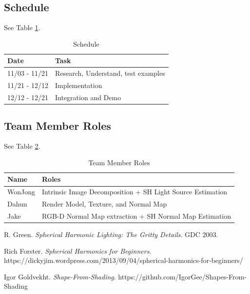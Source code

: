 \documentclass[10pt,twocolumn,letterpaper]{article}
\begin{document}
\subsection{Schedule}
See Table \ref{tab:sched}.
\begin{table}[h]
	\begin{tabular}{l|l}
		\textbf{Date} & Task \\
		\hline
		11/03 - 11/21 & Research, Understand, test examples \\
		11/21 - 12/12 & Implementation \\
		12/12 - 12/21 & Integration and Demo \\
		\hline
	\end{tabular}
	\caption{Schedule}
	\label{tab:sched}
\end{table}

\subsection{Team Member Roles}
See Table \ref{tab:roles}.
\begin{table}[h]
	\begin{tabular}{l|l}
		\textbf{Name} & Roles \\
		\hline
		WonJong & Intrinsic Image Decomposition + SH Light Source Estimation \\
		Dahun & Render Model, Texture, and Normal Map \\
		Jake & RGB-D Normal Map extraction + SH Normal Map Estimation \\
		\hline
	\end{tabular}
	\caption{Team Member Roles}
	\label{tab:roles}
\end{table}

\begin{thebibliography}{1}
	R. Green.
	\textit{Spherical Harmonic Lighting: The Gritty Details}. 
	GDC 2003.
	
	Rich Forster.
	\textit{Spherical Harmonics for Beginners}. 
	https://dickyjim.wordpress.com/2013/09/04/spherical-harmonics-for-beginners/
	
	
	Igor Goldvekht. 
	\textit{Shape-From-Shading}. 
	https://github.com/IgorGee/Shapes-From-Shading
\end{thebibliography}
\end{document}
